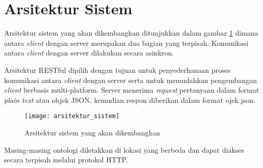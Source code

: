 \section{Arsitektur Sistem}
Arsitektur sistem yang akan dikembangkan ditunjukkan dalam gambar \ref{fig:arsitektur_sistem} dimana antara \emph{client} dengan server merupakan dua bagian yang terpisah. Komunikasi antara \emph{client} dengan server dilakukan secara asinkron. 

Arsitektur RESTful dipilih dengan tujuan untuk penyederhanaan proses komunikasi antara \emph{client} dengan server serta untuk memudahkan pengembangan \emph{client} berbasis multi-platform. Server menerima \emph{request} pertanyaan dalam format \emph{plain text} atau objek JSON, kemudian respon diberikan dalam format ojek json.

\begin{figure}[ht]
    \centering
    \texttt{[image: arsitektur\_sistem]}
    \caption{Arsitektur sistem yang akan dikembangkan}
    \label{fig:arsitektur_sistem}
\end{figure}

Masing-masing ontologi diletakkan di lokasi yang berbeda dan dapat diakses secara terpisah melalui protokol HTTP.